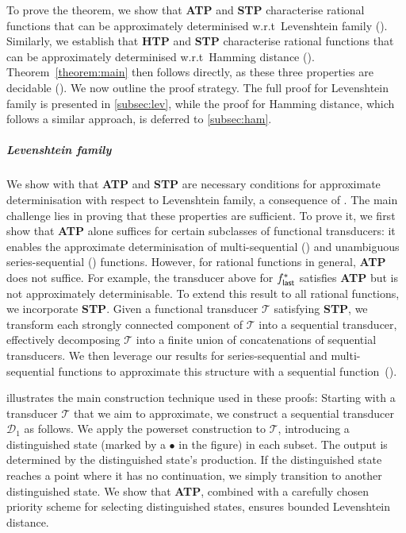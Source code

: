 \documentclass[a4paper,UKenglish,cleveref, autoref, thm-restate,authorcolumns, colorlinks]{lipics-v2021}
\newcommand\calD{\mathcal{D}}
\newcommand{\trans}{\mathcal{T}}
\newcommand{\ATP}[0]{\textbf{ATP}}
\newcommand{\STP}[0]{\textbf{STP}}
\newcommand{\HTP}[0]{\textbf{HTP}}
\begin{document}
To prove the theorem, we show that \ATP{} and \STP{} characterise
rational functions that can be approximately determinised w.r.t~Levenshtein family ().
Similarly, we establish that \HTP{} and \STP{} characterise rational functions that can be approximately determinised
w.r.t~Hamming distance ().
Theorem~\ref{theorem:main} then follows directly,
as these three properties are decidable ().
We now outline the proof strategy.
The full proof for Levenshtein family is presented in \cref{subsec:lev},
while the proof for Hamming distance, which follows a similar approach, is deferred to \cref{subsec:ham}.

\vspace{-0.3cm}
\subparagraph*{Levenshtein family}
We show with  that \ATP{} and \STP{}
are necessary conditions for approximate determinisation with respect to Levenshtein family,
a consequence of .
The main challenge lies in proving that these properties are sufficient.
To prove it, we first show that \ATP{} alone
suffices for certain subclasses of functional transducers:
it enables the approximate determinisation of multi-sequential ()
and unambiguous series-sequential () functions.
However, for rational functions in general, \ATP{} does not suffice. For example, the transducer above for $f^*_{\sf last}$ satisfies \ATP{} but is not approximately determinisable.
To extend this result to all rational functions,
we incorporate \STP{}.
Given a functional transducer $\trans$ satisfying \STP{},
we transform each strongly connected component of  $\trans$ into a sequential transducer,
effectively decomposing $\trans$ into a finite union of concatenations of sequential transducers.
We then leverage our results for series-sequential and multi-sequential functions
to approximate this structure with a sequential function~().

 illustrates the main construction technique used in these proofs:
Starting with a transducer 
$\trans$ that we aim to approximate, we construct a sequential transducer 
$\calD_1$ as follows. We apply the powerset construction to 
$\trans$, introducing a distinguished state (marked by a $\bullet$ in the figure) in each subset.
The output is determined by the distinguished state’s production.
If the distinguished state reaches a point where it has no continuation,
we simply transition to another distinguished state.
We show that \ATP{}, combined with a carefully chosen priority scheme for selecting distinguished states,
ensures bounded Levenshtein distance.
\end{document}

